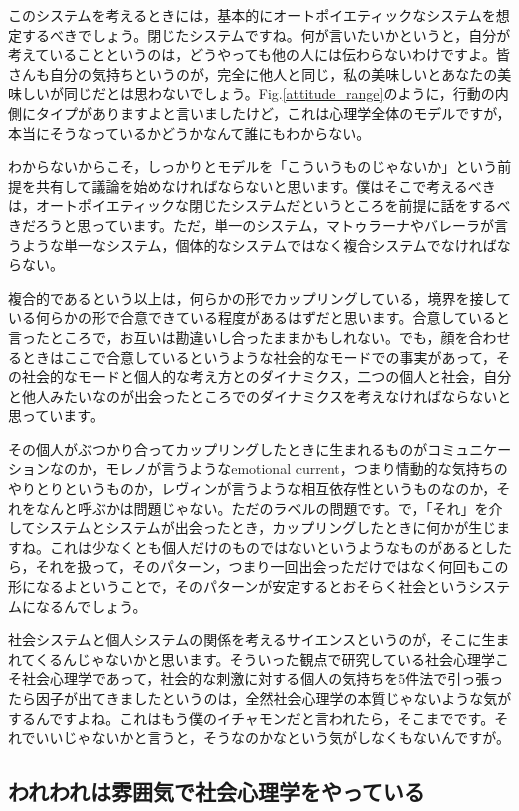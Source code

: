 \documentclass{ltjsbook}
\begin{document}
このシステムを考えるときには，基本的にオートポイエティックなシステムを想定するべきでしょう。閉じたシステムですね。何が言いたいかというと，自分が考えていることというのは，どうやっても他の人には伝わらないわけですよ。皆さんも自分の気持ちというのが，完全に他人と同じ，私の美味しいとあなたの美味しいが同じだとは思わないでしょう。Fig.\ref{attitude_range}のように，行動の内側にタイプがありますよと言いましたけど，これは心理学全体のモデルですが，本当にそうなっているかどうかなんて誰にもわからない。

わからないからこそ，しっかりとモデルを「こういうものじゃないか」という前提を共有して議論を始めなければならないと思います。僕はそこで考えるべきは，オートポイエティックな閉じたシステムだというところを前提に話をするべきだろうと思っています。ただ，単一のシステム，マトゥラーナやバレーラが言うような単一なシステム，個体的なシステムではなく複合システムでなければならない。

複合的であるという以上は，何らかの形でカップリングしている，境界を接している何らかの形で合意できている程度があるはずだと思います。合意していると言ったところで，お互いは勘違いし合ったままかもしれない。でも，顔を合わせるときはここで合意しているというような社会的なモードでの事実があって，その社会的なモードと個人的な考え方とのダイナミクス，二つの個人と社会，自分と他人みたいなのが出会ったところでのダイナミクスを考えなければならないと思っています。

その個人がぶつかり合ってカップリングしたときに生まれるものがコミュニケーションなのか，モレノが言うようなemotional current，つまり情動的な気持ちのやりとりというものか，レヴィンが言うような相互依存性というものなのか，それをなんと呼ぶかは問題じゃない。ただのラベルの問題です。で，「それ」を介してシステムとシステムが出会ったとき，カップリングしたときに何かが生じますね。これは少なくとも個人だけのものではないというようなものがあるとしたら，それを扱って，そのパターン，つまり一回出会っただけではなく何回もこの形になるよということで，そのパターンが安定するとおそらく社会というシステムになるんでしょう。

社会システムと個人システムの関係を考えるサイエンスというのが，そこに生まれてくるんじゃないかと思います。そういった観点で研究している社会心理学こそ社会心理学であって，社会的な刺激に対する個人の気持ちを5件法で引っ張ったら因子が出てきましたというのは，全然社会心理学の本質じゃないような気がするんですよね。これはもう僕のイチャモンだと言われたら，そこまでです。それでいいじゃないかと言うと，そうなのかなという気がしなくもないんですが。

\subsection{われわれは雰囲気で社会心理学をやっている}
\end{document}
